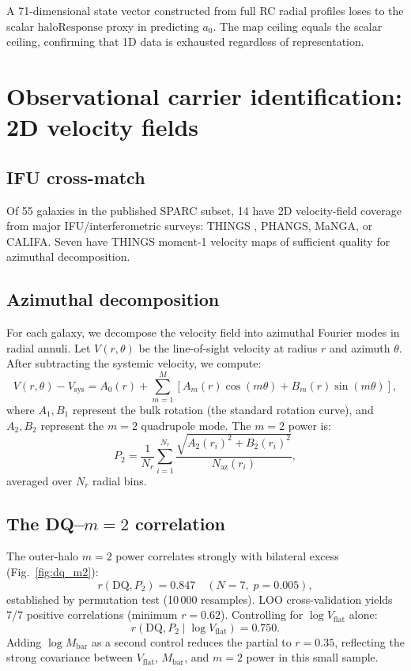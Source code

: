 \documentclass[fleqn,usenatbib]{mnras}
\newcommand{\vflat}{V_\mathrm{flat}}
\newcommand{\azero}{a_0}
\newcommand{\DQ}{\mathrm{DQ}}
\newcommand{\mtwo}{m{=}2}
\begin{document}
A 71-dimensional state vector constructed from full RC radial profiles loses to the scalar $\mathrm{haloResponse}$ proxy in predicting $\azero$.
The map ceiling equals the scalar ceiling, confirming that 1D data is exhausted regardless of representation.


\section{Observational carrier identification: 2D velocity fields}
\label{sec:2D}

\subsection{IFU cross-match}

Of 55 galaxies in the published SPARC subset, 14 have 2D velocity-field coverage from major IFU/interferometric surveys: THINGS \citep{Walter2008}, PHANGS, MaNGA, or CALIFA.
Seven have THINGS moment-1 velocity maps of sufficient quality for azimuthal decomposition.

\subsection{Azimuthal decomposition}

For each galaxy, we decompose the velocity field into azimuthal Fourier modes in radial annuli.
Let $V(r, \theta)$ be the line-of-sight velocity at radius $r$ and azimuth $\theta$.
After subtracting the systemic velocity, we compute:
\begin{equation}
V(r, \theta) - V_\mathrm{sys} = A_0(r) + \sum_{m=1}^{M} \left[ A_m(r) \cos(m\theta) + B_m(r) \sin(m\theta) \right],
\end{equation}
where $A_1, B_1$ represent the bulk rotation (the standard rotation curve), and $A_2, B_2$ represent the $\mtwo$ quadrupole mode.
The $\mtwo$ power is:
\begin{equation}
P_2 = \frac{1}{N_r} \sum_{i=1}^{N_r} \frac{\sqrt{A_2(r_i)^2 + B_2(r_i)^2}}{N_\mathrm{az}(r_i)},
\end{equation}
averaged over $N_r$ radial bins.

\subsection{The DQ--$\mtwo$ correlation}

The outer-halo $\mtwo$ power correlates strongly with bilateral excess (Fig.~\ref{fig:dq_m2}):
\begin{equation}
r(\DQ, P_2) = 0.847 \quad (N = 7, \; p = 0.005),
\end{equation}
established by permutation test (10\,000 resamples).
LOO cross-validation yields 7/7 positive correlations (minimum $r = 0.62$).
Controlling for $\log\vflat$ alone:
\begin{equation}
r(\DQ, P_2 \mid \log\vflat) = 0.750.
\end{equation}
Adding $\log M_\mathrm{bar}$ as a second control reduces the partial to $r = 0.35$, reflecting the strong covariance between $\vflat$, $M_\mathrm{bar}$, and $\mtwo$ power in this small sample.
\end{document}
